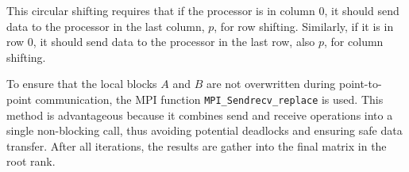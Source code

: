 \documentclass{article}
\begin{document}
\bigskip
\noindent
This circular shifting requires that if the processor is in column 0, it should send data to the processor in the last column, \( p \), for row shifting. Similarly, if it is in row 0, it should send data to the processor in the last row, also \( p \), for column shifting.

\bigskip 
\noindent
To ensure that the local blocks \( A \) and \( B \) are not overwritten during point-to-point communication, the MPI function \texttt{MPI\_Sendrecv\_replace} is used. This method is advantageous because it combines send and receive operations into a single non-blocking call, thus avoiding potential deadlocks and ensuring safe data transfer. After all iterations, the results are gather into the final matrix in the root rank.
\end{document}
